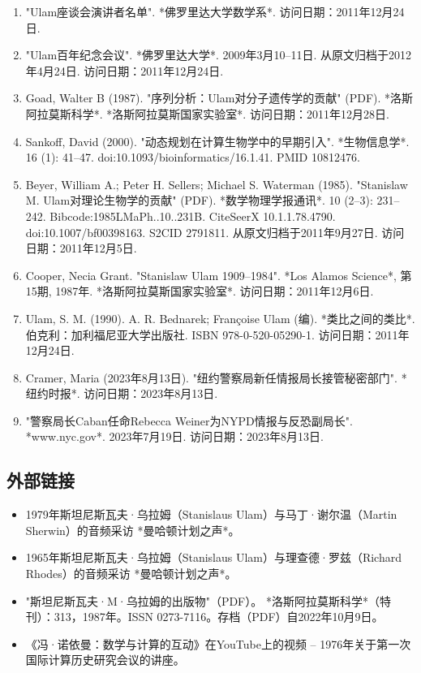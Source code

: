 \begin{enumerate}
\item "Ulam座谈会演讲者名单". *佛罗里达大学数学系*. 访问日期：2011年12月24日.
\item "Ulam百年纪念会议". *佛罗里达大学*. 2009年3月10–11日. 从原文归档于2012年4月24日. 访问日期：2011年12月24日.
\item Goad, Walter B (1987). "序列分析：Ulam对分子遗传学的贡献" (PDF). *洛斯阿拉莫斯科学*. *洛斯阿拉莫斯国家实验室*. 访问日期：2011年12月28日.
\item Sankoff, David (2000). "动态规划在计算生物学中的早期引入". *生物信息学*. 16 (1): 41–47. doi:10.1093/bioinformatics/16.1.41. PMID 10812476.
\item Beyer, William A.; Peter H. Sellers; Michael S. Waterman (1985). "Stanislaw M. Ulam对理论生物学的贡献" (PDF). *数学物理学报通讯*. 10 (2–3): 231–242. Bibcode:1985LMaPh..10..231B. CiteSeerX 10.1.1.78.4790. doi:10.1007/bf00398163. S2CID 2791811. 从原文归档于2011年9月27日. 访问日期：2011年12月5日.
\item Cooper, Necia Grant. "Stanislaw Ulam 1909–1984". *Los Alamos Science*, 第15期, 1987年. *洛斯阿拉莫斯国家实验室*. 访问日期：2011年12月6日.
\item Ulam, S. M. (1990). A. R. Bednarek; Françoise Ulam (编). *类比之间的类比*. 伯克利：加利福尼亚大学出版社. ISBN 978-0-520-05290-1. 访问日期：2011年12月24日.
\item Cramer, Maria (2023年8月13日). "纽约警察局新任情报局长接管秘密部门". *纽约时报*. 访问日期：2023年8月13日.
\item "警察局长Caban任命Rebecca Weiner为NYPD情报与反恐副局长". *www.nyc.gov*. 2023年7月19日. 访问日期：2023年8月13日.
\end{enumerate}
\subsection{外部链接}
\begin{itemize}
\item 1979年斯坦尼斯瓦夫·乌拉姆（Stanislaus Ulam）与马丁·谢尔温（Martin Sherwin）的音频采访 *曼哈顿计划之声*。
\item 1965年斯坦尼斯瓦夫·乌拉姆（Stanislaus Ulam）与理查德·罗兹（Richard Rhodes）的音频采访 *曼哈顿计划之声*。
\item "斯坦尼斯瓦夫·M·乌拉姆的出版物"（PDF）。 *洛斯阿拉莫斯科学*（特刊）：313，1987年。ISSN 0273-7116。存档（PDF）自2022年10月9日。
\item 《冯·诺依曼：数学与计算的互动》在YouTube上的视频 – 1976年关于第一次国际计算历史研究会议的讲座。
\end{itemize}
